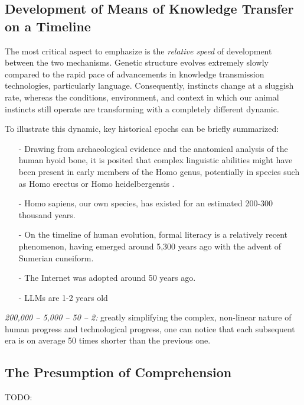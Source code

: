 \documentclass[11pt,a4]{article}
\begin{document}
    \subsection{Development of Means of Knowledge Transfer on a Timeline}

 \par
    The most critical aspect to emphasize is the \textit{relative speed} of
    development between the two mechanisms. Genetic structure evolves extremely
    slowly compared to the rapid pace of advancements in knowledge transmission
    technologies, particularly language. Consequently, instincts change at a
    sluggish rate, whereas the conditions, environment, and context in
    which our animal instincts still operate are transforming with a
    completely different dynamic.\\
    \par
        To illustrate this dynamic, key historical epochs can be briefly summarized:


        \begin{itemize}
            \item[-] Drawing from archaeological evidence and the anatomical analysis of the human hyoid bone, it is posited that complex linguistic abilities might have been present in early members of the Homo genus, potentially in species such as Homo erectus or Homo heidelbergensis \cite{Capasso2008AHE}.
            \item[-] Homo sapiens, our own species, has existed for an estimated 200-300 thousand years\cite{Vidal}.
            \item[-] On the timeline of human evolution, formal literacy is a relatively recent phenomenon, having emerged around 5,300 years ago with the advent of Sumerian cuneiform\cite{Walker}.
            \item[-] The Internet was adopted around 50 years ago.
            \item[-] LLMs are 1-2 years old
        \end{itemize}


        \textit{200,000 – 5,000 – 50 – 2:}
        greatly simplifying the complex, non-linear nature of human progress and technological progress, one can notice that each subsequent era is on average 50 times shorter than the previous one.



\subsection{The Presumption of Comprehension}
    TODO:
\end{document}
